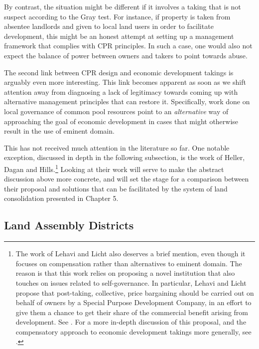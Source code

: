 By contrast, the situation might be different if it involves a taking that is not suspect according to the Gray test. For instance, if property is taken from absentee landlords and given to local land users in order to facilitate development, this might be an honest attempt at setting up a management framework that complies with CPR principles. In such a case, one would also not expect the balance of power between owners and takers to point towards abuse.

The second link between CPR design and economic development takings is arguably even more interesting. This link becomes apparent as soon as we shift attention away from diagnosing a lack of legitimacy towards coming up with alternative management principles that can restore it. Specifically, work done on local governance of common pool resources point to an {\it alternative} way of approaching the goal of economic development in cases that might otherwise result in the use of eminent domain. 

This has not received much attention in the literature so far. One notable exception, discussed in depth in the following subsection, is the work of Heller, Dagan and Hills.\footnote{The work of Lehavi and Licht also deserves a brief mention, even though it focuses on compensation rather than alternatives to eminent domain. The reason is that this work relies on proposing a novel institution that also touches on issues related to self-governance. In particular, Lehavi and Licht propose that post-taking, collective, price bargaining should be carried out on behalf of owners by a Special Purpose Development Company, in an effort to give them a chance to get their share of the commercial benefit arising from development. See \cite{lehavi07}. For a more in-depth discussion of this proposal, and the compensatory approach to economic development takings more generally, see \cite{dyrkolbotn15}.} Looking at their work will serve to make the abstract discussion above more concrete, and will set the stage for a comparison between their proposal and solutions that can be facilitated by the system of land consolidation presented in Chapter 5.

\subsection{Land Assembly Districts}\label{sec:3:6:1}

